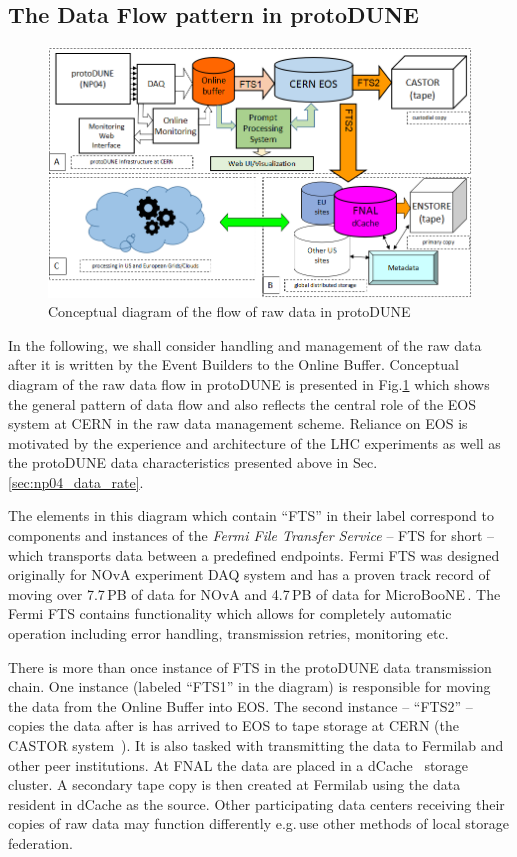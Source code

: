 \documentclass[a4paper]{jpconf}
\newcommand{\pd}{protoDUNE\xspace}
\begin{document}
\subsection{The Data Flow pattern in \pd}
\label{sec:flow}
\begin{figure}[tbh]
\centering\includegraphics[width=0.85\linewidth]{figures/protoDUNE_data_flow_2017_v2.png}
\caption{\label{fig:raw_concept}Conceptual diagram of the flow of raw data in \pd}
\end{figure}

In the following, we shall consider handling and management of the raw data after it is
written by the Event Builders to the Online Buffer.  Conceptual diagram of the raw data
flow in \pd is presented in Fig.\ref{fig:raw_concept} which shows the general pattern of data flow
and also reflects the central role of the EOS system at CERN \cite{eos} in the raw data management scheme.
Reliance on EOS is motivated by the experience and architecture of the LHC experiments
as well as the \pd data characteristics presented above in Sec.\,\ref{sec:np04_data_rate}.

The elements in this diagram which contain ``FTS'' in their label correspond to components and
instances of the \textit{Fermi File Transfer Service} -- FTS for short \cite{fts} -- which transports
data between a predefined endpoints. Fermi FTS was designed originally for NOvA experiment
\cite{nova} DAQ system and has a proven track record of moving over 7.7\,PB of data for NOvA
and 4.7\,PB of data for MicroBooNE\,\cite{uboone}.
The Fermi FTS contains functionality which allows for completely automatic operation
including error handling, transmission retries, monitoring etc.

There is more than once instance of FTS in the \pd data transmission chain. One instance (labeled ``FTS1''
in the diagram) is responsible for moving the data from the Online Buffer into EOS. The second instance
-- ``FTS2'' --  copies the data after is has arrived to EOS to tape storage at CERN (the CASTOR
system~\cite{castor}). It is also tasked with transmitting the data to Fermilab  and other peer
institutions. At FNAL the data are placed in a dCache~\cite{dcache} storage cluster. A secondary
tape copy is then created at Fermilab using the data resident in dCache as the source.
Other participating data centers receiving their copies of raw data may function differently
e.g.\,use other methods of local storage federation.
\end{document}
